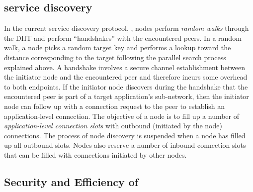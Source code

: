 \subsection{\discv service discovery}
\label{sec:background:discv4}
In the current service discovery protocol, \discv, nodes perform \textit{random walks} through the DHT and perform ``handshakes'' with the encountered peers.
In a random walk, a node picks a random target key and performs a lookup toward the distance corresponding to the target following the parallel search process explained above. 
A handshake involves a secure channel establishment between the initiator node and the encountered peer and therefore incurs some overhead to both endpoints. If the initiator node discovers during the handshake that the encountered peer is part of a target application's sub-network, then the initiator node can follow up with a connection request to the peer to establish an application-level connection. The objective of a node is to fill up a number of \textit{application-level connection slots} with outbound (\ie initiated by the node) connections. The process of node discovery is suspended when a node has filled up all outbound slots. Nodes also reserve a number of inbound connection slots that can be filled with connections initiated by other nodes. 

\subsection{Security and Efficiency of \discv}
\label{sec:securityEfficiency}

